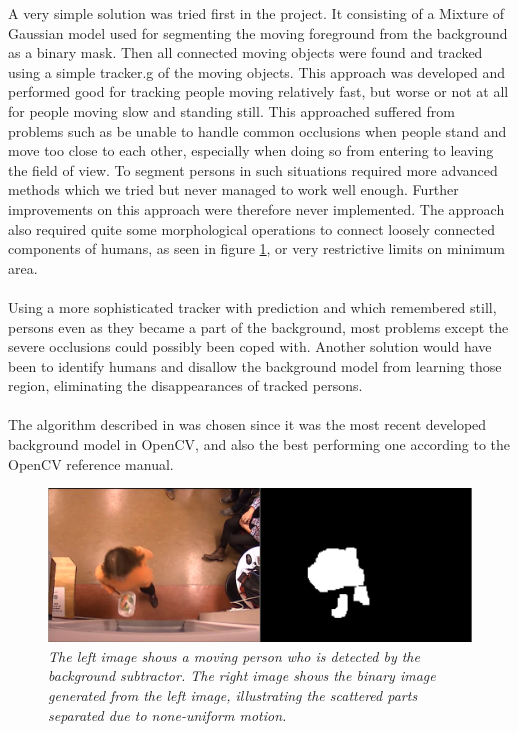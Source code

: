 
A very simple solution was tried first in the project. It consisting of a Mixture of Gaussian model\cite{Gardel} used for segmenting the moving foreground from the background as a binary mask. Then all connected moving objects were found and tracked using a simple tracker.g of the moving objects. This approach was developed and performed good for tracking people moving relatively fast, but worse or not at all for people moving slow and standing still. This approached suffered from problems such as be unable to handle common occlusions when people stand and move too close to each other, especially when doing so from entering to leaving the field of view. To segment persons in such situations required more advanced methods which we tried but never managed to work well enough. Further improvements on this approach were therefore never implemented. The approach also required quite some morphological operations to connect loosely connected components of humans, as seen in figure \ref{fig:bg_success}, or very restrictive limits on minimum area.\\
\\
Using a more sophisticated tracker with prediction and which remembered still, persons even as they became a part of the background, most problems except the severe occlusions could possibly been coped with. Another solution would have been to identify humans and disallow the background model from learning those region, eliminating the disappearances of tracked persons. \\
\\
The algorithm described in \cite{Gardel} was chosen since it was the most recent developed background model in OpenCV, and also the best performing one according to the OpenCV reference manual. 

\vspace{1cm}
\begin{figure}[htb]
	\centering
	\includegraphics[width=\linewidth]{images/bg_success.png}
	\caption[An example of scattered binary mask of a human from the background model.]{\textit{The left image shows a moving person who is detected by the background subtractor. The right image shows the binary image generated from the left image, illustrating the scattered parts separated due to none-uniform motion.
	}}
	\label{fig:bg_success}  %
\end{figure}

